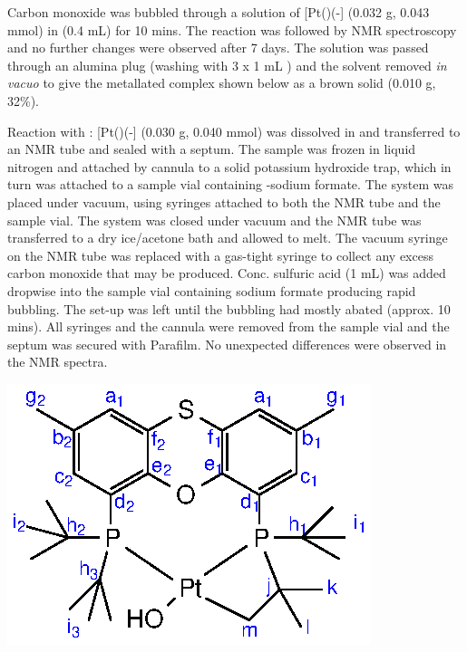 Carbon monoxide was bubbled through a solution of [Pt(\tButhixantphos)(-] (0.032 g, 0.043 mmol) in  (0.4 mL) for 10 mins.  The reaction was followed by NMR spectroscopy and no further changes were observed after 7 days.  The solution was passed through an alumina plug (washing with 3 x 1 mL ) and the solvent removed \emph{in vacuo} to give the metallated complex shown below as a brown solid (0.010 g, 32\%).  

Reaction with :
[Pt(\tButhixantphos)(-] (0.030 g, 0.040 mmol) was dissolved in  and transferred to an NMR tube and sealed with a septum.  The sample was frozen in liquid nitrogen and attached by cannula to a solid potassium hydroxide trap, which in turn was attached to a sample vial containing \carbon{}-sodium formate.  The system was placed under vacuum, using syringes attached to both the NMR tube and the sample vial.  The system was closed under vacuum and the NMR tube was transferred to a dry ice/acetone bath and allowed to melt.  The vacuum syringe on the NMR tube was replaced with a gas-tight syringe to collect any excess carbon monoxide that may be produced.  Conc. sulfuric acid (1 mL) was added dropwise into the sample vial containing sodium formate producing rapid bubbling.  The set-up was left until the bubbling had mostly abated (approx. 10 mins).  All syringes and the cannula were removed from the sample vial and the septum was secured with Parafilm.  No unexpected differences were observed in the NMR spectra.  

\begin{structure}[h]
\begin{center}
\includegraphics{../Structures/Metallated.eps}
\end{center}
\end{structure}

